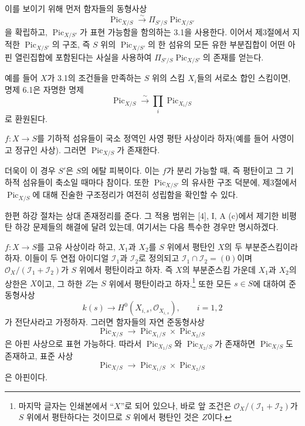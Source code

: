 이를 보이기 위해 먼저 함자들의 동형사상
\[
\operatorname{Pic}_{X/S}\xrightarrow{\sim}
\Pi_{S'/S}\operatorname{Pic}_{X/S'}
\]
을 확립하고, $\operatorname{Pic}_{X/S'}$가 표현 가능함을 함의하는 3.1을
사용한다. 이어서 제3절에서 지적한 $\operatorname{Pic}_{X/S'}$의 구조, 즉
$S$ 위의 $\operatorname{Pic}_{X/S'}$의 한 섬유의 모든 유한 부분집합이 어떤
아핀 열린집합에 포함된다는 사실을 사용하여
$\Pi_{S'/S}\operatorname{Pic}_{X/S'}$의 존재를 얻는다.

예를 들어 $X$가 3.1의 조건들을 만족하는 $S$ 위의 스킴 $X_i$들의 서로소
합인 스킴이면, 명제 6.1은 자명한 명제
\[
\operatorname{Pic}_{X/S}\xrightarrow{\sim}
\prod_i\operatorname{Pic}_{X_i/S}
\]
로 환원된다.

 $f:X\longrightarrow S$를 기하적 섬유들이 국소 정역인
사영 평탄 사상이라 하자(예를 들어 사영이고 정규인 사상). 그러면
$\operatorname{Pic}_{X/S}$가 존재한다.

더욱이 이 경우 $S'$은 $S$의 에탈 피복이다. 이는 $f$가 분리 가능할 때, 즉
평탄이고 그 기하적 섬유들이 축소일 때마다 참이다. 또한
$\operatorname{Pic}_{X/S'}$의 유사한 구조 덕분에, 제3절에서
$\operatorname{Pic}_{X/S}$에 대해 진술한 구조정리가 여전히 성립함을 확인할
수 있다.

한편 하강 절차는 상대 존재정리를 준다. 그 적용 범위는 [4], I, A (c)에서
제기한 비평탄 하강 문제들의 해결에 달려 있는데, 여기서는 다음 특수한
경우만 명시하겠다.

 $f:X\longrightarrow S$를 고유 사상이라 하고, $X_1$과
$X_2$를 $S$ 위에서 평탄인 $X$의 두 부분준스킴이라 하자. 이들이 두 연접
아이디얼 $\mathcal I_1$과 $\mathcal I_2$로 정의되고
$\mathcal I_1\cap\mathcal I_2=(0)$이며
$\mathcal O_X/(\mathcal I_1+\mathcal I_2)$가 $S$ 위에서 평탄이라고 하자.
즉 $X$의 부분준스킴 가운데 $X_1$과 $X_2$의 상한은 $X$이고, 그 하한 $Z$는
$S$ 위에서 평탄이라고 하자.\footnote{마지막 글자는 인쇄본에서 ``$X$''로
되어 있으나, 바로 앞 조건은 $\mathcal O_X/(\mathcal I_1+\mathcal I_2)$가
$S$ 위에서 평탄하다는 것이므로 $S$ 위에서 평탄인 것은 $Z$이다.} 또한 모든
$s\in S$에 대하여 준동형사상
\[
k(s)\longrightarrow H^0(X_{i,s},\mathcal O_{X_{i,s}}),\qquad i=1,2
\]
가 전단사라고 가정하자. 그러면 함자들의 자연 준동형사상
\[
\operatorname{Pic}_{X/S}\longrightarrow
\operatorname{Pic}_{X_1/S}\times\operatorname{Pic}_{X_2/S}
\]
은 아핀 사상으로 표현 가능하다. 따라서 $\operatorname{Pic}_{X_1/S}$와
$\operatorname{Pic}_{X_2/S}$가 존재하면 $\operatorname{Pic}_{X/S}$도
존재하고, 표준 사상
\[
\operatorname{Pic}_{X/S}\longrightarrow
\operatorname{Pic}_{X_1/S}\times\operatorname{Pic}_{X_2/S}
\]
은 아핀이다.

